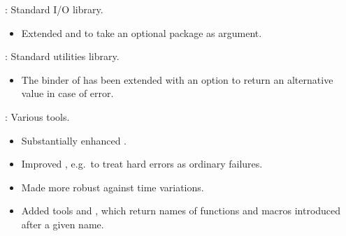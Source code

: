 
\begin{frame}

\implibtitle

:
Standard I/O library.
\begin{itemize}
\item Extended  and 
      to take an optional package as argument.
\end{itemize}

\end{frame}


\begin{frame}

\implibtitle

:
Standard utilities library.
\begin{itemize}
\item The  binder of  has been extended with
      an option  to return an alternative value in case of error.
\end{itemize}

\end{frame}


\begin{frame}

\implibtitle

:
Various tools.
\begin{itemize}
\item Substantially enhanced .
\item Improved , e.g.\ to treat hard errors as ordinary failures.
\item Made  more robust against time variations.
\item Added tools  and ,
      which return names of functions and macros introduced after a given name.
\end{itemize}

\end{frame}


